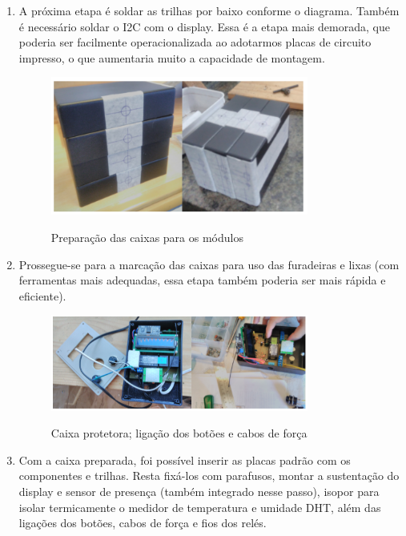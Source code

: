 \begin{enumerate}
	\item A próxima etapa é soldar as trilhas por baixo conforme o diagrama. Também é necessário soldar o I2C com o display. Essa é a etapa mais demorada, que poderia ser facilmente operacionalizada ao adotarmos placas de circuito impresso, o que aumentaria muito a capacidade de montagem.
	
	\begin{figure}[H]
		\centering
		\caption{Preparação das caixas para os módulos}
		\includegraphics[width=0.8\textwidth]{PrepCaixasModulos}
		\label{fig:PrepCaixasModulos}
	\end{figure}

	\item Prossegue-se para a marcação das caixas para uso das furadeiras e lixas (com ferramentas mais adequadas, essa etapa também poderia ser mais rápida e eficiente).
	
	\begin{figure}[H]
		\centering
		\caption{Caixa protetora; ligação dos botões e cabos de força}
		\includegraphics[width=0.8\textwidth]{BotoesCabosForca}
		\label{fig:BotoesCabosForca}
	\end{figure}

	\item Com a caixa preparada, foi possível inserir as placas padrão com os componentes e trilhas. Resta fixá-los com parafusos, montar a sustentação do display e sensor de presença (também integrado nesse passo), isopor para isolar termicamente o medidor de temperatura e umidade DHT, além das ligações dos botões, cabos de força e fios dos relés.


\end{enumerate}
